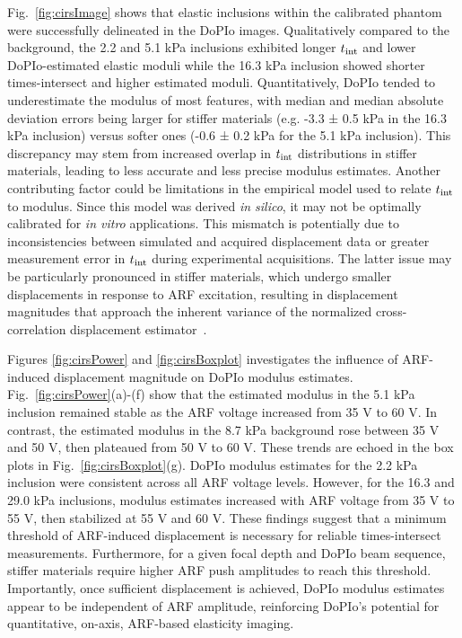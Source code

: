 Fig.~\ref{fig:cirsImage} shows that elastic inclusions within the calibrated phantom were successfully delineated in the DoPIo images. Qualitatively compared to the background, the 2.2 and 5.1 kPa inclusions exhibited longer $t_{\textnormal{int}}$ and lower DoPIo-estimated elastic moduli while the 16.3 kPa inclusion showed shorter times-intersect and higher estimated moduli. Quantitatively, DoPIo tended to underestimate the modulus of most features, with median and median absolute deviation errors being larger for stiffer materials (e.g. -3.3 ± 0.5 kPa in the 16.3 kPa inclusion) versus softer ones (-0.6 ± 0.2 kPa for the 5.1 kPa inclusion). This discrepancy may stem from increased overlap in $t_{\textnormal{int}}$ distributions in stiffer materials, leading to less accurate and less precise modulus estimates. Another contributing factor could be limitations in the empirical model used to relate $t_{\textnormal{int}}$ to modulus. Since this model was derived \emph{in silico}, it may not be optimally calibrated for \emph{in vitro} applications. This mismatch is potentially due to inconsistencies between simulated and acquired displacement data or greater measurement error in $t_{\textnormal{int}}$ during experimental acquisitions. The latter issue may be particularly pronounced in stiffer materials, which undergo smaller displacements in response to ARF excitation, resulting in displacement magnitudes that approach the inherent variance of the normalized cross-correlation displacement estimator~\cite{mcaleavey_Estimates_2003,dhanaliwala_Assessing_2012}.

Figures \ref{fig:cirsPower} and \ref{fig:cirsBoxplot} investigates the influence of ARF-induced displacement magnitude on DoPIo modulus estimates. Fig.~\ref{fig:cirsPower}(a)-(f) show that the estimated modulus in the 5.1 kPa inclusion remained stable as the ARF voltage increased from 35 V to 60 V. In contrast, the estimated modulus in the 8.7 kPa background rose between 35 V and 50 V, then plateaued from 50 V to 60 V. These trends are echoed in the box plots in Fig.~\ref{fig:cirsBoxplot}(g). DoPIo modulus estimates for the 2.2 kPa inclusion were consistent across all ARF voltage levels. However, for the 16.3 and 29.0 kPa inclusions, modulus estimates increased with ARF voltage from 35 V to 55 V, then stabilized at 55 V and 60 V. These findings suggest that a minimum threshold of ARF-induced displacement is necessary for reliable times-intersect measurements. Furthermore, for a given focal depth and DoPIo beam sequence, stiffer materials require higher ARF push amplitudes to reach this threshold. Importantly, once sufficient displacement is achieved, DoPIo modulus estimates appear to be independent of ARF amplitude, reinforcing DoPIo's potential for quantitative, on-axis, ARF-based elasticity imaging.

